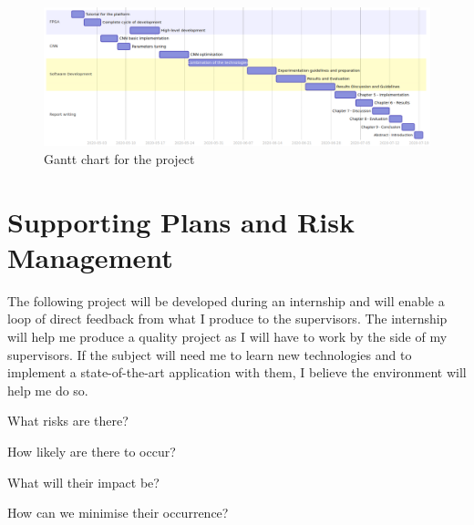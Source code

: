 \begin{figure}[htbp]
	\centering
		\includegraphics[width=\textwidth]{Figures/gantt.png}
	\caption[Gantt Chart]{Gantt chart for the project}
	\label{fig:gantt}
\end{figure}


\section{Supporting Plans and Risk Management}


The following project will be developed during an internship and will enable a loop of direct feedback from what I produce to the supervisors. The internship will help me produce a quality project as I will have to work by the side of my supervisors. If the subject will need me to learn new technologies and to implement a state-of-the-art application with them, I believe the environment will help me do so.

What risks are there?

How likely are there to occur?

What will their impact be?

How can we minimise their occurrence?
